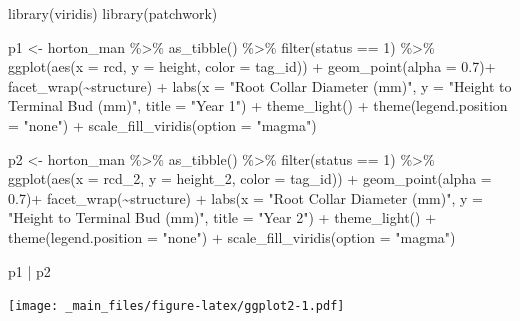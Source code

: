 \documentclass[
]{book}
\newenvironment{Shaded}{\begin{snugshade}}{\end{snugshade}}
\newcommand{\AttributeTok}[1]{\textcolor[rgb]{0.77,0.63,0.00}{#1}}
\newcommand{\DecValTok}[1]{\textcolor[rgb]{0.00,0.00,0.81}{#1}}
\newcommand{\FloatTok}[1]{\textcolor[rgb]{0.00,0.00,0.81}{#1}}
\newcommand{\FunctionTok}[1]{\textcolor[rgb]{0.00,0.00,0.00}{#1}}
\newcommand{\NormalTok}[1]{#1}
\newcommand{\OtherTok}[1]{\textcolor[rgb]{0.56,0.35,0.01}{#1}}
\newcommand{\SpecialCharTok}[1]{\textcolor[rgb]{0.00,0.00,0.00}{#1}}
\newcommand{\StringTok}[1]{\textcolor[rgb]{0.31,0.60,0.02}{#1}}
\begin{document}
\begin{Shaded}
\begin{Highlighting}[]
\FunctionTok{library}\NormalTok{(viridis)}
\FunctionTok{library}\NormalTok{(patchwork)}

\NormalTok{p1 }\OtherTok{\textless{}{-}}\NormalTok{ horton\_man }\SpecialCharTok{\%\textgreater{}\%} 
  \FunctionTok{as\_tibble}\NormalTok{() }\SpecialCharTok{\%\textgreater{}\%} 
  \FunctionTok{filter}\NormalTok{(status }\SpecialCharTok{==} \DecValTok{1}\NormalTok{) }\SpecialCharTok{\%\textgreater{}\%} 
  \FunctionTok{ggplot}\NormalTok{(}\FunctionTok{aes}\NormalTok{(}\AttributeTok{x =}\NormalTok{ rcd, }\AttributeTok{y =}\NormalTok{ height, }\AttributeTok{color =}\NormalTok{ tag\_id)) }\SpecialCharTok{+} 
  \FunctionTok{geom\_point}\NormalTok{(}\AttributeTok{alpha =} \FloatTok{0.7}\NormalTok{)}\SpecialCharTok{+}
  \FunctionTok{facet\_wrap}\NormalTok{(}\SpecialCharTok{\textasciitilde{}}\NormalTok{structure) }\SpecialCharTok{+}
  \FunctionTok{labs}\NormalTok{(}\AttributeTok{x =} \StringTok{"Root Collar Diameter (mm)"}\NormalTok{, }
       \AttributeTok{y =} \StringTok{"Height to Terminal Bud (mm)"}\NormalTok{, }
       \AttributeTok{title =} \StringTok{"Year 1"}\NormalTok{) }\SpecialCharTok{+}
  \FunctionTok{theme\_light}\NormalTok{() }\SpecialCharTok{+} 
  \FunctionTok{theme}\NormalTok{(}\AttributeTok{legend.position =} \StringTok{"none"}\NormalTok{) }\SpecialCharTok{+}  
  \FunctionTok{scale\_fill\_viridis}\NormalTok{(}\AttributeTok{option =} \StringTok{"magma"}\NormalTok{) }

\NormalTok{p2 }\OtherTok{\textless{}{-}}\NormalTok{ horton\_man }\SpecialCharTok{\%\textgreater{}\%} 
  \FunctionTok{as\_tibble}\NormalTok{() }\SpecialCharTok{\%\textgreater{}\%} 
  \FunctionTok{filter}\NormalTok{(status }\SpecialCharTok{==} \DecValTok{1}\NormalTok{) }\SpecialCharTok{\%\textgreater{}\%} 
  \FunctionTok{ggplot}\NormalTok{(}\FunctionTok{aes}\NormalTok{(}\AttributeTok{x =}\NormalTok{ rcd\_2, }\AttributeTok{y =}\NormalTok{ height\_2, }\AttributeTok{color =}\NormalTok{ tag\_id)) }\SpecialCharTok{+} 
  \FunctionTok{geom\_point}\NormalTok{(}\AttributeTok{alpha =} \FloatTok{0.7}\NormalTok{)}\SpecialCharTok{+}
  \FunctionTok{facet\_wrap}\NormalTok{(}\SpecialCharTok{\textasciitilde{}}\NormalTok{structure) }\SpecialCharTok{+}
  \FunctionTok{labs}\NormalTok{(}\AttributeTok{x =} \StringTok{"Root Collar Diameter (mm)"}\NormalTok{, }
       \AttributeTok{y =} \StringTok{"Height to Terminal Bud (mm)"}\NormalTok{, }
       \AttributeTok{title =} \StringTok{"Year 2"}\NormalTok{) }\SpecialCharTok{+}
  \FunctionTok{theme\_light}\NormalTok{() }\SpecialCharTok{+} 
  \FunctionTok{theme}\NormalTok{(}\AttributeTok{legend.position =} \StringTok{"none"}\NormalTok{) }\SpecialCharTok{+}  
  \FunctionTok{scale\_fill\_viridis}\NormalTok{(}\AttributeTok{option =} \StringTok{"magma"}\NormalTok{) }

\NormalTok{p1 }\SpecialCharTok{|}\NormalTok{ p2}
\end{Highlighting}
\end{Shaded}

\texttt{[image: \_main\_files/figure-latex/ggplot2-1.pdf]}

  
\end{document}
